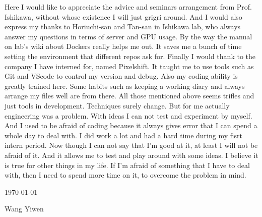 ﻿Here I would like to appreciate the advice and seminars arrangement from Prof. Ishikawa, without whose 
existence I will just grigri around. And I would also express my thanks to Horiuchi-san and Tan-san in 
Ishikawa lab, who always answer my questions in terms of server and GPU usage. By the way the manual on 
lab's wiki about Dockers really helps me out. It saves me a bunch of time setting the environment that different 
repos ask for. Finally I would thank to the company I have interned for, named Pixelshift. It taught me to 
use tools such as Git and VScode to control my version and debug. Also my coding ability is greatly trained 
here. Some habits such as keeping a working diary and always arrange my files well are from there.
All those mentioned above seems trifles and just tools in development. Techniques surely change. But for me actually engineering was a 
problem. With ideas I can not test and experiment by myself. And I used to be afraid of coding because it always 
gives error that I can spend a whole day to deal with. I did work a lot and had a hard time during my fisrt intern period. Now though 
I can not say that I'm good at it, at least I will not be afraid of it. And it allows me to test and play around with 
some ideas. I believe it is true for other things in my life. If I'm afraid of something that I have to deal with, then
I need to spend more time on it, to overcome the problem in mind.  

\begin{flushright}
\par
\noindent
\today

\par
\noindent
Wang Yiwen
\end{flushright}
